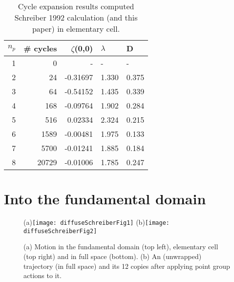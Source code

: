 \documentclass[aps,pre,
                showpacs,
                twocolumn,
                groupedaddress,
                floatfix]{revtex4-1}
\begin{document}
\begin{table}[htbp]
\begin{tabular}{|r|r|r|l|l|}
\hline
${n_p}$ & \# cycles & $\zeta$(0,0) & $\lambda$ & D \\ \hline\hline
1      & 0      &   -    &   -  &   - \\
2      & 24     & -0.31697 & 1.330 & 0.375\\
3      & 64     & -0.54152 & 1.435 & 0.339\\
4      & 168    & -0.09764 & 1.902 & 0.284\\
5      & 516    &  0.02334 & 2.324 & 0.215\\
6      & 1589   & -0.00481 & 1.975 & 0.133\\
7      & 5700   & -0.01241 & 1.885 & 0.184\\
8      & 20729  & -0.01006 & 1.785 & 0.247\\ \hline

\end{tabular}
\caption{\label{TCELL1}
Cycle expansion results computed Schreiber 1992 calculation (and
  this paper) in elementary cell.
}
\end{table}

\section{Into the fundamental domain}
\label{s-SymmetryReduction}
\begin{figure}[htbp]
  \begin{center}
    (a)\texttt{[image: diffuseSchreiberFig1]}
    (b)\texttt{[image: diffuseSchreiberFig2]}
  \end{center}
  \caption[]{\label{fig-schrieberFig12} (a) Motion in the fundamental domain (top left), elementary cell (top right) and  in full space (bottom). (b) An (unwrapped) trajectory (in full  space) and its 12 copies after applying point group actions to it.   }
\end{figure}

\end{document}
